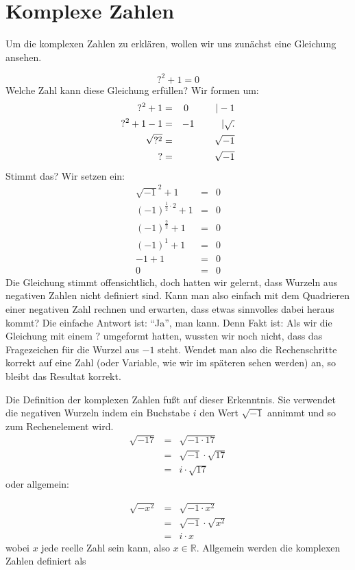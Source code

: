
\chapter{Komplexe Zahlen}

Um die komplexen Zahlen zu erklären, wollen wir uns zunächst eine Gleichung ansehen. 

\[ ?^2 +1 = 0 \]
Welche Zahl kann diese Gleichung erfüllen? Wir formen um:
\begin{eqnarray*}
?^2 +1 &=& 0 \hskip 1cm | -1 \\
?^2 +1 -1 &=& -1 \hskip 1cm | \sqrt{.} \\
\sqrt{?^2} &=& \sqrt{-1} \\
? &=& \sqrt{-1}
\end{eqnarray*}
Stimmt das? Wir setzen ein:
\begin{eqnarray*}
\sqrt{-1}^2 +1 &=& 0 \\
(-1)^{\frac{1}{2}\cdot 2} +1 &=& 0 \\
(-1)^{\frac{2}{2}} +1 &=& 0 \\
(-1)^{1} +1 &=& 0 \\
-1+1 &=& 0 \\
0 &=& 0
\end{eqnarray*}
Die Gleichung stimmt offensichtlich, doch hatten wir gelernt, dass Wurzeln aus negativen Zahlen nicht definiert sind. Kann man also einfach mit dem Quadrieren einer negativen Zahl rechnen und erwarten, dass etwas sinnvolles dabei heraus kommt? Die einfache Antwort ist: "`Ja"', man kann. Denn Fakt ist: Als wir die Gleichung mit einem $?$ umgeformt hatten, wussten wir noch nicht, dass das Fragezeichen für die Wurzel aus $-1$ steht. Wendet man also die Rechenschritte korrekt auf eine Zahl (oder Variable, wie wir im späteren sehen werden) an, so bleibt das Resultat korrekt. 

Die Definition der komplexen Zahlen fußt auf dieser Erkenntnis. Sie verwendet die negativen Wurzeln indem ein Buchstabe $i$  den Wert $\sqrt{-1}$ annimmt und so zum Rechenelement wird.
\begin{eqnarray*}
\sqrt{-17} &=& \sqrt{-1\cdot 17}\\
&=& \sqrt{-1}\cdot \sqrt{17}\\
&=& i \cdot \sqrt{17}
\end{eqnarray*}
oder allgemein:

\begin{eqnarray*}
\sqrt{-x^2} &=& \sqrt{-1\cdot x^2}\\
&=& \sqrt{-1}\cdot \sqrt{x^2}\\
&=& i \cdot x
\end{eqnarray*}
wobei $x$ jede reelle Zahl sein kann, also $x\in \mathbb{R}$. Allgemein werden die komplexen Zahlen definiert als 

